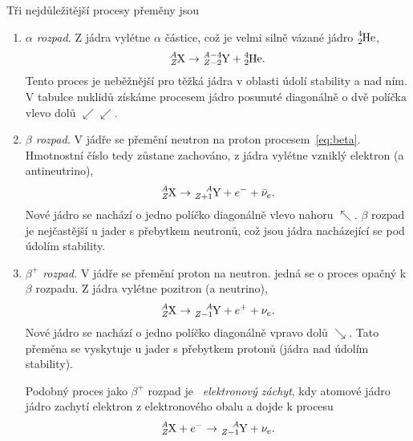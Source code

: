 \documentclass[a4paper,12pt,oneside]{article}
\theoremstyle{red}
\begin{document}
    Tři nejdůležitější procesy přeměny jsou
    \begin{enumerate}
        \item\emph{$\alpha$ rozpad.}
            Z jádra vylétne $\alpha$ částice, což je velmi silně vázané jádro $\ce{^{4}_{2}He}$,
            \begin{equation}
                \ce{^{\it A}_{\it Z}X}\rightarrow\ce{^{{\it A}-4}_{{\it Z}-2}Y}+\ce{^{4}_{2}He}.
            \end{equation}
            Tento proces je neběžnější pro těžká jádra v oblasti údolí stability a nad ním.
            V tabulce nuklidů získáme procesem jádro posunuté diagonálně o dvě políčka vlevo dolů $\swarrow\swarrow$.

        \item\emph{$\beta$ rozpad.}
            V jádře se přemění neutron na proton procesem~\eqref{eq:beta}.
            Hmotnostní číslo tedy zůstane zachováno, z jádra vylétne vzniklý elektron (a antineutrino),
            \begin{equation}
                \ce{^{\it A}_{\it Z}X}\rightarrow\ce{^{\it A}_{{\it Z}+1}Y}+e^{-}+\bar{\nu}_{e}.
            \end{equation}
            Nové jádro se nachází o jedno políčko diagonálně vlevo nahoru $\nwarrow$.
            $\beta$ rozpad je nejčastější u jader s přebytkem neutronů, což jsou jádra nacházející se pod údolím stability.
        
        \item\emph{$\beta^{+}$ rozpad.}
            V jádře se přemění proton na neutron.
            jedná se o proces opačný k $\beta$ rozpadu.
            Z jádra vylétne pozitron (a neutrino),
            \begin{equation}
                \ce{^{\it A}_{\it Z}X}\rightarrow\ce{^{\it A}_{{\it Z}-1}Y}+e^{+}+\nu_{e}.                    
            \end{equation}
            Nové jádro se nachází o jedno políčko diagonálně vpravo dolů $\searrow$.
            Tato přeměna se vyskytuje u jader s přebytkem protonů (jádra nad údolím stability).

            Podobný proces jako $\beta^{+}$ rozpad je ~\emph{elektronový záchyt}, kdy atomové jádro jádro zachytí elektron z elektronového obalu a dojde k procesu
            \begin{equation}
                \ce{^{\it A}_{\it Z}X}+e^{-}\rightarrow\ce{^{\it A}_{{\it Z}-1}Y}+\nu_{e}.                    
            \end{equation}
    \end{enumerate}
\end{document}
